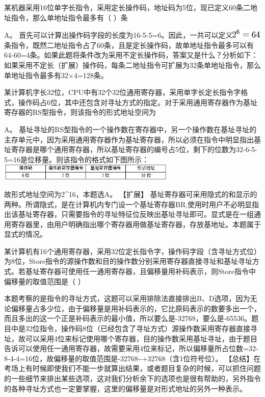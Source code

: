 \question 某机器采用16位单字长指令，采用定长操作码，地址码为5位，现已定义60条二地址指令，那么单地址指令最多有（
）条
\par{}
\begin{solution}A。
首先可以计算出操作码字段的长度为16-5-5=6。因此，一共可以定义\includegraphics[width=0.56250in,height=0.16667in]{texmath/e1c5005Cdpi7B3507D25E63D64}条指令，既然二地址指令占了60条，且是定长操作码，故单地址指令最多可以有64-60=4条。如果此题将条件改为采用不定长操作码，答案又是什么？分析如下：
如果采用不定长（扩展）操作码，每条二地址指令可扩展为32条单地址指令，那么单地址指令最多有32×4=128条。
\end{solution}
\question 某计算机字长32位，CPU中有32个32位通用寄存器，采用单字长定长指令字格式，操作码占6位，其中还包含对寻址方式的指定。对于采用通用寄存器作为基址寄存器的RS型指令，则该指令的形式地址空间为
\par{}
\begin{solution}A。
基址寻址的RS型指令的一个操作数在寄存器中，另一个操作数在基址寻址的主存单元中，因为采用通用寄存器作为基址寄存器，所以必须在指令中明显指出基址寄存器是哪个通用寄存器，所以基址寄存器的编号占5位，剩下的位数为32-6-5-5=16是位移量。则该指令的格式如下图所示：
\includegraphics[width=3.33333in,height=0.31250in]{computerassets/5f6d4ab9dd73df215b670169449c0593.jpeg}~

故形式地址空间为2\^{}16，本题选A。 【扩展】
基址寄存器可采用隐式的和显示的两种。所谓隐式，是在计算机内专门设一个基址寄存器BR,使用时用户不必明显指出该基址寄存器，只需要指令的寻址特征位反映出基址寻址即可。显式是在一组通用寄存器里，由用户明确指出哪个寄存器用做基址寄存器，存放基地址。本题属于显式的情况。
\end{solution}
\question 某计算机有16个通用寄存器，采用32位定长指令字，操作码字段（含寻址方式位）为8位，Store指令的源操作数和目的操作数分别采用寄存器直接寻址和基址寻址方式。若基址寄存器可使用任一通用寄存器，且偏移量用补码表示，则Store指令中偏移量的取值范围是（
）
\par{}
\begin{solution}本题考察的是指令的寻址方式，这题可以采用排除法直接排出B、D选项，因为无论偏移量占多少位，由于偏移量是用补码表示的，它比原码表示的数要多出一个，而且多出的这一个正是补码表示的最小值，所以要么是-32768，要么是-65536。题目中是32位指令，操作码8位（已经包含了寻址方式）源操作数采用寄存器直接寻址，故可以采用4位来标记使用哪个寄存器，目的操作数采用基址寻址，由于题目告诉可以使用任一通用寄存器，故需要采用4位来标记，所以偏移量所占位数=32-8-4-4=16位，故偏移量的取值范围是-32768\textasciitilde{}+32768（含1位符号位）。
【总结】在考场上有时候即使我们不能一步就算出结果，或者题目复杂的时候，可以抓住问题的一些细节来排出某些选项，这对我们分析余下的选项也是很有帮助的，另外指令的各种寻址方式也一定要掌握，这里的偏移量是对形式地址的另外一种表示。
\end{solution}
